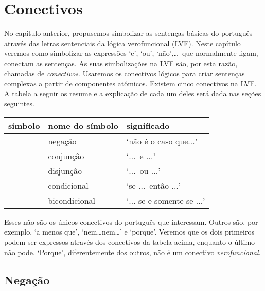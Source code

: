 \chapter{Conectivos}
\label{s:TFLConnectives}

No capítulo anterior, propusemos simbolizar as sentenças básicas do português através das letras sentenciais da lógica verofuncional (LVF).
Neste capítulo veremos como simbolizar as expressões `e', `ou', `não',\ldots\ 
que normalmente ligam, conectam as sentenças.
As suas simbolizações na LVF são, por esta razão, chamadas de \emph{conectivos}.
Usaremos os conectivos lógicos para criar sentenças complexas a partir de componentes atômicos. Existem cinco conectivos na LVF.
A tabela a seguir os resume e a explicação de cada um deles será dada nas seções seguintes.

	\begin{table}[h]
	\center
	\begin{tabular}{l l l}
	
	\textbf{símbolo}&\textbf{nome do símbolo}&\textbf{significado}\\
	\hline
	\enot&negação&`não é o caso que$\ldots$'\\
	\eand&conjunção&`$\ldots$\ e $\ldots$'\\
	\eor&disjunção&`$\ldots$\ ou $\ldots$'\\
	\eif&condicional&`se $\ldots$\ então $\ldots$'\\
	\eiff&bicondicional&`$\ldots$ se e somente se $\ldots$'\\
	
	\end{tabular}
	\label{table:TFLConnectives}
	\end{table}

Esses não são os únicos conectivos do português que interessam.
Outros são, por exemplo, `a menos que', `nem\ldots{}nem\ldots' e `porque'.
Veremos que os dois primeiros podem ser expressos através dos conectivos da tabela acima, enquanto o último não pode.
`Porque', diferentemente dos outros, não é um conectivo \emph{verofuncional}.
        
\section{Negação}

